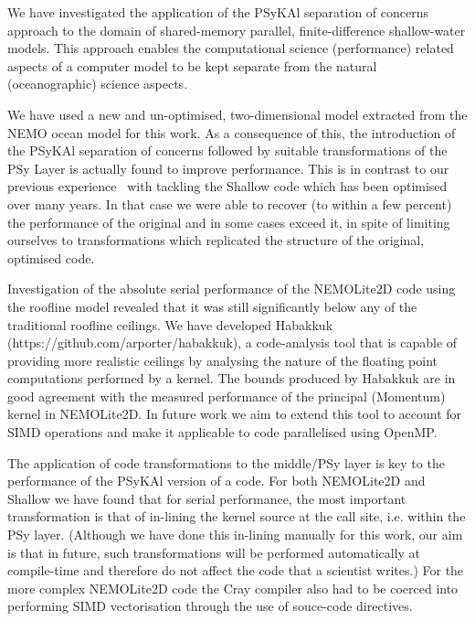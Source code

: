 \documentclass[gmd, manuscript]{copernicus}
\begin{document}
\conclusions

We have investigated the application of the {PS}y{KA}l separation of
concerns approach to the domain of shared-memory parallel,
finite-difference shallow-water models. This approach enables the
computational science (performance) related aspects of a computer
model to be kept separate from the natural (oceanographic) science
aspects.

We have used a new and un-optimised, two-dimensional model extracted
from the NEMO ocean model for this work. As a consequence of this, the
introduction of the {PS}y{KA}l separation of concerns followed by
suitable transformations of the PSy Layer is actually found to improve
performance. This is in contrast to our previous
experience~\citep{shallow_psykal} with tackling the Shallow code which
has been optimised over many years. In that case we were able to
recover (to within a few percent) the performance of the original and
in some cases exceed it, in spite of limiting ourselves to
transformations which replicated the structure of the original,
optimised code.

Investigation of the absolute serial performance of the NEMOLite2D
code using the roofline model revealed that it was still significantly
below any of the traditional roofline ceilings. We have developed
Habakkuk (https://github.com/arporter/habakkuk), a code-analysis tool
that is capable of providing more realistic ceilings by analysing the
nature of the floating point computations performed by a kernel. The
bounds produced by Habakkuk are in good agreement with the measured
performance of the principal (Momentum) kernel in NEMOLite2D. In
future work we aim to extend this tool to account for SIMD operations
and make it applicable to code parallelised using OpenMP.

The application of code transformations to the middle/PSy layer is key
to the performance of the {PS}y{KA}l version of a code. For both
NEMOLite2D and Shallow we have found that for serial performance, the
most important transformation is that of in-lining the kernel source
at the call site, i.e. within the PSy layer. (Although we have done
this in-lining manually for this work, our aim is that in future, such
transformations will be performed automatically at compile-time and
therefore do not affect the code that a scientist writes.)
For the more complex NEMOLite2D code the Cray compiler also
had to be coerced into performing SIMD vectorisation through the use
of souce-code directives.
\end{document}
